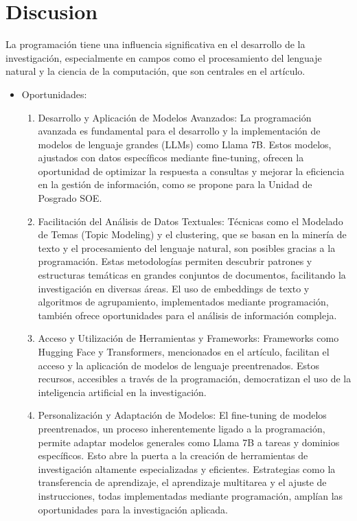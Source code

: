 \documentclass[12pt,twocolumn]{article}
\begin{document}
\section{Discusion}
La programación tiene una influencia significativa en el desarrollo de la investigación, especialmente en campos como el procesamiento del lenguaje natural y la ciencia de la computación, que son centrales en el artículo.
\begin{itemize}
\item Oportunidades:
    \begin{enumerate}
        \item Desarrollo y Aplicación de Modelos Avanzados: La programación avanzada es fundamental para el desarrollo y la implementación de modelos de lenguaje grandes (LLMs) como Llama 7B. 
        Estos modelos, ajustados con datos específicos mediante fine-tuning, ofrecen la oportunidad de optimizar la respuesta a consultas y mejorar la eficiencia en la gestión de información, como se propone para la Unidad de Posgrado SOE.
        \item Facilitación del Análisis de Datos Textuales: Técnicas como el Modelado de Temas (Topic Modeling) y el clustering, que se basan en la minería de texto y el procesamiento del lenguaje natural, son posibles gracias a la programación. 
        Estas metodologías permiten descubrir patrones y estructuras temáticas en grandes conjuntos de documentos, facilitando la investigación en diversas áreas. 
        El uso de embeddings de texto y algoritmos de agrupamiento, implementados mediante programación, también ofrece oportunidades para el análisis de información compleja.
        \item Acceso y Utilización de Herramientas y Frameworks: Frameworks como Hugging Face y Transformers, mencionados en el artículo, facilitan el acceso y la aplicación de modelos de lenguaje preentrenados. 
        Estos recursos, accesibles a través de la programación, democratizan el uso de la inteligencia artificial en la investigación.
        \item Personalización y Adaptación de Modelos: El fine-tuning de modelos preentrenados, un proceso inherentemente ligado a la programación, permite adaptar modelos generales como Llama 7B a tareas y dominios específicos. 
        Esto abre la puerta a la creación de herramientas de investigación altamente especializadas y eficientes. 
        Estrategias como la transferencia de aprendizaje, el aprendizaje multitarea y el ajuste de instrucciones, todas implementadas mediante programación, amplían las oportunidades para la investigación aplicada.

\end{enumerate}
\end{itemize}
\end{document}
